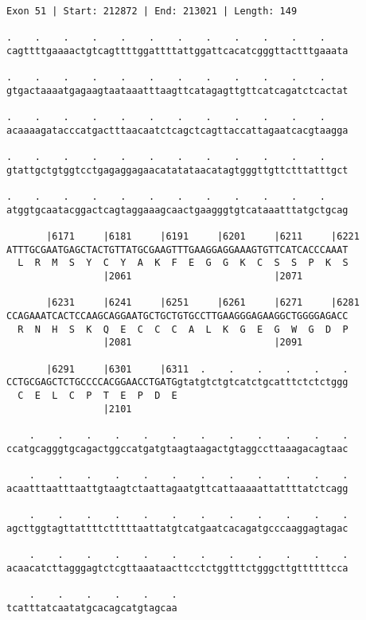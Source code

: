 \documentclass{article}
\begin{document}
\begin{Verbatim}
Exon 51 | Start: 212872 | End: 213021 | Length: 149
 
.    .    .    .    .    .    .    .    .    .    .    .    
cagttttgaaaactgtcagttttggattttattggattcacatcgggttactttgaaata
  
.    .    .    .    .    .    .    .    .    .    .    .    
gtgactaaaatgagaagtaataaatttaagttcatagagttgttcatcagatctcactat
  
.    .    .    .    .    .    .    .    .    .    .    .    
acaaaagatacccatgactttaacaatctcagctcagttaccattagaatcacgtaagga
  
.    .    .    .    .    .    .    .    .    .    .    .    
gtattgctgtggtcctgagaggagaacatatataacatagtgggttgttctttatttgct
  
.    .    .    .    .    .    .    .    .    .    .    .    
atggtgcaatacggactcagtaggaaagcaactgaagggtgtcataaatttatgctgcag
  
       |6171     |6181     |6191     |6201     |6211     |6221
ATTTGCGAATGAGCTACTGTTATGCGAAGTTTGAAGGAGGAAAGTGTTCATCACCCAAAT
  L  R  M  S  Y  C  Y  A  K  F  E  G  G  K  C  S  S  P  K  S
                 |2061                         |2071        
  
       |6231     |6241     |6251     |6261     |6271     |6281
CCAGAAATCACTCCAAGCAGGAATGCTGCTGTGCCTTGAAGGGAGAAGGCTGGGGAGACC
  R  N  H  S  K  Q  E  C  C  C  A  L  K  G  E  G  W  G  D  P
                 |2081                         |2091        
  
       |6291     |6301     |6311  .    .    .    .    .    .
CCTGCGAGCTCTGCCCCACGGAACCTGATGgtatgtctgtcatctgcatttctctctggg
  C  E  L  C  P  T  E  P  D  E                              
                 |2101                                      
  
    .    .    .    .    .    .    .    .    .    .    .    .
ccatgcagggtgcagactggccatgatgtaagtaagactgtaggccttaaagacagtaac
  
    .    .    .    .    .    .    .    .    .    .    .    .
acaatttaatttaattgtaagtctaattagaatgttcattaaaaattattttatctcagg
  
    .    .    .    .    .    .    .    .    .    .    .    .
agcttggtagttattttctttttaattatgtcatgaatcacagatgcccaaggagtagac
  
    .    .    .    .    .    .    .    .    .    .    .    .
acaacatcttagggagtctcgttaaataacttcctctggtttctgggcttgttttttcca
  
    .    .    .    .    .    .
tcatttatcaatatgcacagcatgtagcaa
\end{Verbatim}
\end{document}
